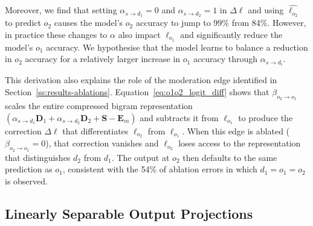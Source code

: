 Moreover, we find that setting $\alpha_{s \to d_1} = 0$ and $\alpha_{s \to d_2} = 1$ in $\Delta\boldsymbol\ell$ and using $\hat{\boldsymbol\ell_{o_2}}$ to predict $o_2$ causes the model's $o_2$ accuracy to jump to 99\% from 84\%. However, in practice these changes to $\alpha$ also impact $\boldsymbol\ell_{o_1}$ and significantly reduce the model's ${o_1}$ accuracy. We hypothesise that the model learns to balance a reduction in ${o_2}$ accuracy for a relatively larger increase in ${o_1}$ accuracy through $\alpha_{s \to d_i}$.

This derivation also explains the role of the moderation edge identified in Section~\ref{ss:results-ablations}. Equation~\eqref{eq:o1o2_logit_diff} shows that $\beta_{o_2 \to o_1}$ scales the entire compressed bigram representation $(\alpha_{s \to d_1}\boldsymbol{D}_1 + \alpha_{s \to d_2}\boldsymbol{D}_2 + \boldsymbol{S} - \boldsymbol{E}_m)$ and subtracts it from $\boldsymbol{\ell}_{o_1}$ to produce the correction $\Delta\boldsymbol{\ell}$ that differentiates $\boldsymbol{\ell}_{o_2}$ from $\boldsymbol{\ell}_{o_1}$. When this edge is ablated ($\beta_{o_2 \to o_1} = 0$), that correction vanishes and $\boldsymbol{\ell}_{o_2}$ loses access to the representation that distinguishes $d_2$ from $d_1$. The output at $o_2$ then defaults to the same prediction as $o_1$, consistent with the 54\% of ablation errors in which $d_1 = o_1 = o_2$ is observed.


\subsection{Linearly Separable Output Projections}\label{ss:results-linsep}



